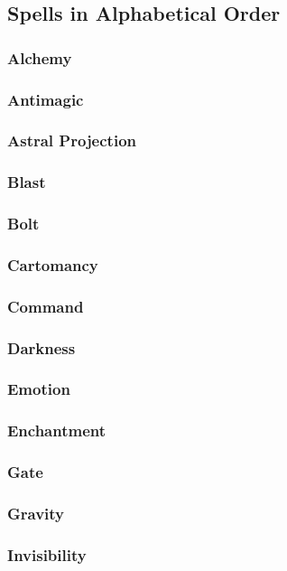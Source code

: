 \subsection{Spells in Alphabetical Order}
\begin{multicols}{3}
\subsubsection*{Alchemy}
\subsubsection*{Antimagic}
\subsubsection*{Astral Projection}
\subsubsection*{Blast}
\subsubsection*{Bolt}
\subsubsection*{Cartomancy}
\subsubsection*{Command}
\subsubsection*{Darkness}
\subsubsection*{Emotion}
\subsubsection*{Enchantment}
\subsubsection*{Gate}
\subsubsection*{Gravity}
\subsubsection*{Invisibility}

\end{multicols}

